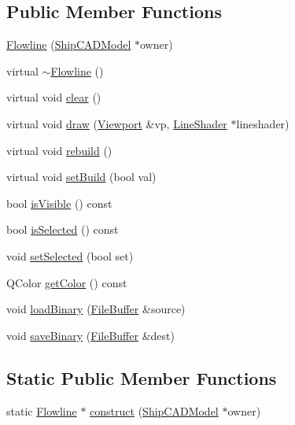 \subsection*{Public Member Functions}
\begin{DoxyCompactItemize}
\item 
\hyperlink{classShipCAD_1_1Flowline_aee316a748229f5abafac72ebe3af1e41}{Flowline} (\hyperlink{classShipCAD_1_1ShipCADModel}{Ship\-C\-A\-D\-Model} $\ast$owner)
\item 
virtual \hyperlink{classShipCAD_1_1Flowline_a4961f751d69e469e974d7d39f539b460}{$\sim$\-Flowline} ()
\item 
virtual void \hyperlink{classShipCAD_1_1Flowline_ac3bbbbd3d853214bb9c9feeb7a12314d}{clear} ()
\item 
virtual void \hyperlink{classShipCAD_1_1Flowline_a8b43ac96514f62c6fb0db938eccd0d44}{draw} (\hyperlink{classShipCAD_1_1Viewport}{Viewport} \&vp, \hyperlink{classShipCAD_1_1LineShader}{Line\-Shader} $\ast$lineshader)
\item 
virtual void \hyperlink{classShipCAD_1_1Flowline_a28e5d73316c6d2c8005428669a9e9b97}{rebuild} ()
\item 
virtual void \hyperlink{classShipCAD_1_1Flowline_ad148400a3e53b2368b37c2c7f50ec1b7}{set\-Build} (bool val)
\item 
bool \hyperlink{classShipCAD_1_1Flowline_a86839bd40eccaef22050ba6f15aec361}{is\-Visible} () const 
\item 
bool \hyperlink{classShipCAD_1_1Flowline_a17a5a1693579fab85df64dac8f7a5fa8}{is\-Selected} () const 
\item 
void \hyperlink{classShipCAD_1_1Flowline_a4ade2663ee4102e0eff8920eeeaf8b37}{set\-Selected} (bool set)
\item 
Q\-Color \hyperlink{classShipCAD_1_1Flowline_a546cee93d649cc3514bf2fcd19694ecf}{get\-Color} () const 
\item 
void \hyperlink{classShipCAD_1_1Flowline_a2910767b8fc3beb218d84bbb9d35fd7d}{load\-Binary} (\hyperlink{classShipCAD_1_1FileBuffer}{File\-Buffer} \&source)
\item 
void \hyperlink{classShipCAD_1_1Flowline_aeb29f59014b7df1e44dd6bda92dbc95d}{save\-Binary} (\hyperlink{classShipCAD_1_1FileBuffer}{File\-Buffer} \&dest)
\end{DoxyCompactItemize}
\subsection*{Static Public Member Functions}
\begin{DoxyCompactItemize}
\item 
static \hyperlink{classShipCAD_1_1Flowline}{Flowline} $\ast$ \hyperlink{classShipCAD_1_1Flowline_a9a07b50a90e9d96d347583dc15b5d07e}{construct} (\hyperlink{classShipCAD_1_1ShipCADModel}{Ship\-C\-A\-D\-Model} $\ast$owner)
\end{DoxyCompactItemize}
